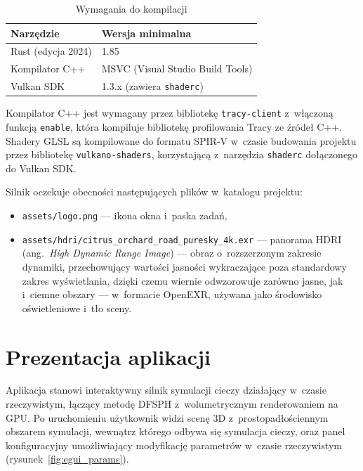 \begin{table}[H]
\centering
\caption{Wymagania do kompilacji}
\label{tab:build_requirements}
\begin{tabular}{ll}
\toprule
\textbf{Narzędzie} & \textbf{Wersja minimalna} \\
\midrule
Rust (edycja 2024) & 1.85 \\
Kompilator C++ & MSVC (Visual Studio Build Tools) \\
Vulkan SDK & 1.3.x (zawiera \texttt{shaderc}) \\
\bottomrule
\end{tabular}
\end{table}

Kompilator C++ jest wymagany przez bibliotekę \texttt{tracy-client}
z~włączoną funkcją \texttt{enable}, która kompiluje bibliotekę profilowania
Tracy ze źródeł C++. Shadery GLSL są kompilowane do formatu SPIR-V
w~czasie budowania projektu przez bibliotekę \texttt{vulkano-shaders},
korzystającą z~narzędzia \texttt{shaderc} dołączonego do Vulkan SDK.

Silnik oczekuje obecności następujących plików w~katalogu projektu:
\begin{itemize}
    \item \texttt{assets/logo.png} --- ikona okna i~paska zadań,
    \item \texttt{assets/hdri/citrus\_orchard\_road\_puresky\_4k.exr} ---
          panorama \newline HDRI (ang.~\textit{High Dynamic Range Image}) --- obraz
          o~rozszerzonym zakresie dynamiki, przechowujący wartości jasności
          wykraczające poza standardowy zakres wyświetlania, dzięki czemu wiernie
          odwzorowuje zarówno jasne, jak i~ciemne obszary --- w~formacie OpenEXR,
          używana jako środowisko oświetleniowe i~tło sceny.
\end{itemize}

\section{Prezentacja aplikacji}
\label{sec:app_presentation}

Aplikacja stanowi interaktywny silnik symulacji cieczy działający w~czasie rzeczywistym,
łączący metodę DFSPH z~wolumetrycznym renderowaniem na GPU.
Po uruchomieniu użytkownik widzi scenę 3D z~prostopadłościennym obszarem symulacji,
wewnątrz którego odbywa się symulacja cieczy, oraz panel konfiguracyjny
umożliwiający modyfikację parametrów w~czasie rzeczywistym
(rysunek~\ref{fig:egui_params}).

